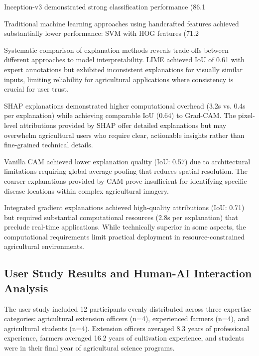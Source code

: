 \documentclass[agriculture,article,submit,pdftex,moreauthors]{Definitions/mdpi}
\begin{document}
Inception-v3 demonstrated strong classification performance (86.1%

Traditional machine learning approaches using handcrafted features achieved substantially lower performance: SVM with HOG features (71.2%


Systematic comparison of explanation methods reveals trade-offs between different approaches to model interpretability. LIME achieved IoU of 0.61 with expert annotations but exhibited inconsistent explanations for visually similar inputs, limiting reliability for agricultural applications where consistency is crucial for user trust.

SHAP explanations demonstrated higher computational overhead (3.2s vs. 0.4s per explanation) while achieving comparable IoU (0.64) to Grad-CAM. The pixel-level attributions provided by SHAP offer detailed explanations but may overwhelm agricultural users who require clear, actionable insights rather than fine-grained technical details.

Vanilla CAM achieved lower explanation quality (IoU: 0.57) due to architectural limitations requiring global average pooling that reduces spatial resolution. The coarser explanations provided by CAM prove insufficient for identifying specific disease locations within complex agricultural imagery.

Integrated gradient explanations achieved high-quality attributions (IoU: 0.71) but required substantial computational resources (2.8s per explanation) that preclude real-time applications. While technically superior in some aspects, the computational requirements limit practical deployment in resource-constrained agricultural environments.

\subsection{User Study Results and Human-AI Interaction Analysis}


The user study included 12 participants evenly distributed across three expertise categories: agricultural extension officers (n=4), experienced farmers (n=4), and agricultural students (n=4). Extension officers averaged 8.3 years of professional experience, farmers averaged 16.2 years of cultivation experience, and students were in their final year of agricultural science programs.
\end{document}

